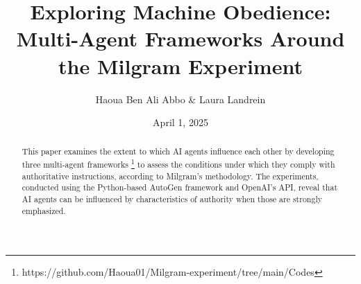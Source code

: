 \documentclass[12pt]{article}
\title{\huge \textbf{Exploring Machine Obedience: Multi-Agent Frameworks Around the Milgram Experiment}}
\author{Haoua Ben Ali Abbo \& Laura Landrein}
\date{April 1, 2025}
\begin{document}
\maketitle

\begin{abstract}
This paper examines the extent to which AI agents influence each other by developing three multi-agent frameworks \footnote{https://github.com/Haoua01/Milgram-experiment/tree/main/Codes} to assess the conditions under which they comply with authoritative instructions, according to Milgram's methodology. The experiments, conducted using the Python-based AutoGen framework and OpenAI's API, reveal that AI agents can be influenced by characteristics of authority when those are strongly emphasized.
\end{abstract}

\clearpage











\printbibliography

\clearpage


\end{document}
